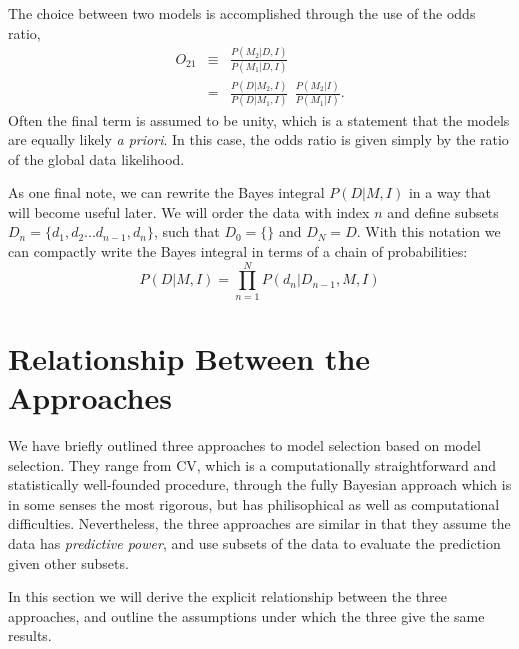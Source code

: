 \documentclass[12pt]{article}
\begin{document}
The choice between two models is accomplished through the use of the odds
ratio,
\begin{eqnarray}
  O_{21} &\equiv& \frac{P(M_2|D,I)}{P(M_1|D,I)}\\
        &=& \frac{P(D|M_2,I)}{P(D|M_1,I)}\ \ \frac{P(M_2|I)}{P(M_1|I)}.
\end{eqnarray}
Often the final term is assumed to be unity, which is a statement
that the models are equally likely {\it a priori}.  In this case, the
odds ratio is given simply by the ratio of the global data likelihood.

As one final note, we can rewrite the Bayes integral $P(D|M,I)$ in a way
that will become useful later.  We will order the data with index $n$ and
define subsets $D_{n} = \{d_1, d_2 ... d_{n-1}, d_n\}$, such that $D_0 = \{\}$
and $D_N = D$.  With this notation we can compactly write the Bayes integral
in terms of a chain of probabilities:
\begin{equation}
  \label{eq:bayes_chain}
  P(D|M,I) = \prod_{n=1}^N P(d_n|D_{n-1},M,I)
\end{equation}

\section{Relationship Between the Approaches}
We have briefly outlined three approaches to model selection based on model
selection.  They range from CV, which is a computationally straightforward
and statistically well-founded procedure, through the fully Bayesian approach
which is in some senses the most rigorous, but has philisophical as well
as computational difficulties.  Nevertheless, the three approaches are similar
in that they assume the data has {\it predictive power}, and use subsets of
the data to evaluate the prediction given other subsets.

In this section we will derive the explicit relationship between the three
approaches, and outline the assumptions under which the three give the same
results.
\end{document}

